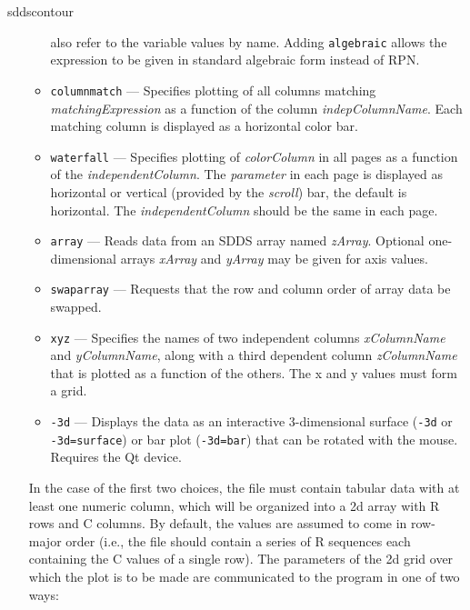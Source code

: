 \begin{sddsprog}{sddscontour}
\begin{itemize}
\begin{itemize}
        also refer to the variable values by name.  Adding \verb|algebraic| allows the
        expression to be given in standard algebraic form instead of RPN.
        \item \verb|columnmatch| --- Specifies plotting of all columns matching {\em matchingExpression}
        as a function of the column {\em indepColumnName}.  Each matching column is displayed as a horizontal
        color bar.
        \item \verb|waterfall| --- Specifies plotting of {\em colorColumn} in all pages as a function of the
        {\em independentColumn}. The {\em parameter} in each page is displayed as horizontal or vertical (provided
        by the {\em scroll}) bar, the default is horizontal. The {\em independentColumn} should be the same in
        each page.
        \item \verb|array| --- Reads data from an SDDS array named {\em zArray}.  Optional one-dimensional arrays
          {\em xArray} and {\em yArray} may be given for axis values.
        \item \verb|swaparray| --- Requests that the row and column order of array data be swapped.
        \item \verb|xyz| --- Specifies the names of two independent columns {\em xColumnName} and {\em yColumnName}, along with
          a third dependent column {\em zColumnName} that is plotted as a function of the others.
          The x and y values must form a grid.
        \item \verb|-3d| --- Displays the data as an interactive 3-dimensional surface (\verb|-3d| or \verb|-3d=surface|) or bar plot (\verb|-3d=bar|) that can be rotated with the mouse. Requires the Qt device.
        \end{itemize}

        In the case of the first two choices, the file must contain
tabular data with at least one numeric column, which will be organized
into a 2d array with R rows and C columns.  By default, the values are
assumed to come in row-major order (i.e., the file should contain a
series of R sequences each containing the C values of a single row).
The parameters of the 2d grid over which the plot is to be made are
communicated to the program in one of two ways:

\begin{enumerate}


\end{enumerate}
\end{itemize}
\end{sddsprog}
